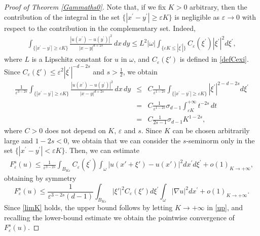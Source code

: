 \documentclass[10pt,a4paper]{amsart}
\def\e{\varepsilon}
\begin{document}
\begin{proof}[Proof of Theorem \rm\ref{Gammaths0}]
Note that, if we fix $K>0$ arbitrary, then the contribution of the integral in the set $\{|x^\prime-y^\prime|\geq \e K\}$ is negligible as $\e\to 0$ with respect to the contribution in the complementary set. Indeed,
\begin{eqnarray*}
\int_{\{|x^\prime-y^\prime|\geq \e K\}} \frac{|u(x^\prime)-u(y^\prime)|^2}{|x-y|^{d+2s}}\, dx\, dy\leq 
L^2|\omega|\int_{\{\e K\leq |\xi^\prime|\}} C_\e(\xi^\prime)|\xi^\prime|^2 d\xi^\prime, 
\end{eqnarray*}
where $L$ is a Lipschitz constant for $u$ in $\omega$, and $C_\e(\xi')$ is defined in \eqref{defCexi}. 
Since $C_\e(\xi')\leq \e^{2}|\xi^\prime|^{-d-2s}$ and $s>\frac{1}{2}$, we obtain  
\begin{eqnarray*}
\frac{1}{\e^{3-2s}}\int_{\{|x^\prime-y^\prime|\geq \e K\}} \frac{|u(x^\prime)-u(y^\prime)|^2}{|x-y|^{d+2s}}\, dx\, dy &\leq &C\frac{1}{\e^{1-2s}}
\int_{\{|x^\prime-y^\prime|\geq \e K\}} |\xi^\prime|^{2-d-2s} d\xi^\prime\\
&=&C\frac{1}{\e^{1-2s}} \sigma_{d-1}\int_{\e K}^{+\infty} t^{-2s}\, dt\\
&=&C\frac{1}{2s-1} \sigma_{d-1}K^{1-2s}, 
\end{eqnarray*} 
where $C>0$ does not depend on $K$, $\e$ and $s$. 
Since $K$ can be chosen arbitrarily large and $1-2s<0$, we obtain that we can consider the $s$-seminorm only in the set $\{|x^\prime-y^\prime|<\e K\}$. 
Then, we can estimate
\begin{eqnarray*}
{F_\e^{s}(u)}\leq \frac{1}{\e^{3-2s}}\int_{B_{K\e}}C_\e(\xi^\prime)\int_{\omega}
|u(x'+\xi')-u(x')|^2 dx^\prime d\xi^\prime+o(1)_{K\to+\infty}, 
\end{eqnarray*}
obtaining by symmetry 
\begin{equation}\label{up}
{F_\e^{s}(u)}\leq 
\frac{1}{\e^{3-2s}(d-1)}\int_{B_{K\e}}|\xi'|^2 C_\e(\xi') d\xi^\prime \int_{\omega}
|\nabla u|^2 dx^\prime +o(1)_{K\to+\infty}.
\end{equation}
Since \eqref{limK} holds, the upper bound follows
by letting $K\to+\infty$ in \eqref{up}, and recalling the lower-bound estimate we obtain the pointwise convergence of $F_\e^s(u)$. 
\end{proof}
\end{document}
